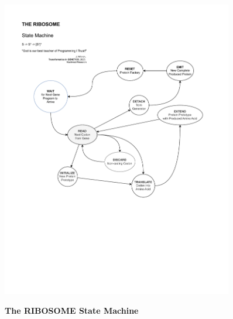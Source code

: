 \documentclass[a4paper, 18pt]{article} %
\begin{document}
\begin{figure}[H]
  \begin{center}
   \includegraphics[trim=0cm 9cm 0cm 1.6cm, clip, width=0.9\textwidth,]{resources/pdfs/RibosomeStateMachine.pdf}\\
   \caption{\textbf{The RIBOSOME State Machine}}
  \label{FIG4}
  \end{center}
\end{figure}
\end{document}

